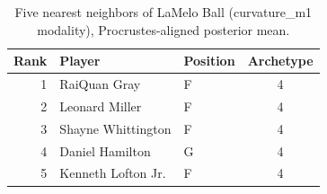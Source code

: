\begin{table}[htbp]
  \centering\small
  \begin{tabular}{rllc}
    \toprule
    Rank & Player & Position & Archetype \\
    \midrule
    1 & RaiQuan Gray & F & 4 \\
    2 & Leonard Miller & F & 4 \\
    3 & Shayne Whittington & F & 4 \\
    4 & Daniel Hamilton & G & 4 \\
    5 & Kenneth Lofton Jr. & F & 4 \\
    \bottomrule
  \end{tabular}
  \caption{Five nearest neighbors of LaMelo Ball (curvature_m1 modality), Procrustes-aligned posterior mean.}
  \label{tab:LaMelo_Ball_neighbors_curvature_m1}
\end{table}

